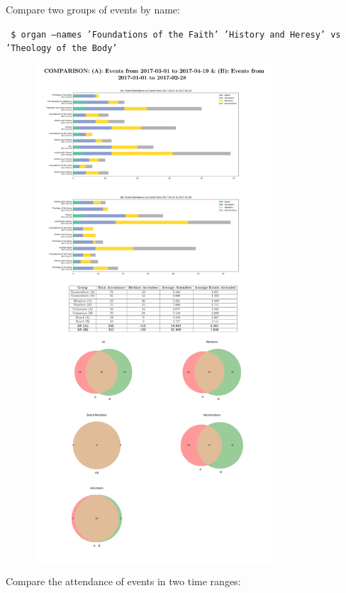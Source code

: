 \documentclass[12pt]{article}
\begin{document}
Compare two groups of events by name:

\texttt{ \$ organ --names 'Foundations of the Faith' 'History and Heresy' vs 'Theology of the Body'}
\begin{figure}[H]
    \centering
    \includegraphics[width=3.5in]{./media/namescomp.pdf}
\end{figure}
\pagebreak

Compare the attendance of events in two time ranges:
\end{document}
